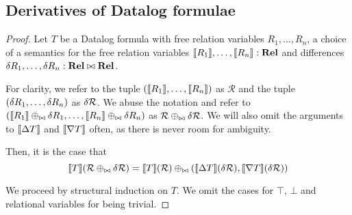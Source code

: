 \subsection {Derivatives of Datalog formulae}
\concreteDatalog*
\begin{proof}
  \newcommand{\sem}[1]{\denote{#1}}
  \label{prf:concreteDatalog}
  Let $T$ be a Datalog formula with free relation variables $R_1, \ldots, R_n$,
  a choice of a semantics for the free relation variables $\sem{R_1}, \ldots, \sem{R_n} : \Rel$
  and differences $\delta R_1, \ldots, \delta R_n : \mathbf{Rel} \bowtie \mathbf{Rel}$.

  
  \newcommand{\upsem}[1]{\sem{\updiff{#1}}}
  \newcommand{\downsem}[1]{\sem{\downdiff{#1}}}
  \newcommand{\bothsem}[1]{\sem{\bothdiff{#1}}}

  \newcommand{\semR}[0]{\mathcal{R}}
  \newcommand{\diffR}[0]{\change{\semR}}
  For clarity, we refer to the tuple $(\sem{R_1}, \ldots, \sem{R_n})$ as $\semR$ and
  the tuple $(\delta R_1, \ldots, \delta R_n)$ as $\diffR$. We abuse the notation
  and refer to $(\sem{R_1} \twist \change{R_1}, \ldots, \sem{R_n} \twist \change{R_n})$
  as $\semR \twist \diffR$. We will also omit the arguments to $\upsem{T}$ and
  $\downsem{T}$ often, as there is never room for ambiguity.

  Then, it is the case that 
  \begin{displaymath}
    \sem{T}(\semR \twist \diffR)
    =
    \sem{T}(\semR) \twist 
    (\sem{\updiff{T}}(\diffR), 
    \sem{\downdiff{T}}(\diffR))
  \end{displaymath}

  We proceed by structural induction on $T$. We omit the cases for $\top$, $\bot$
  and relational variables for being trivial.
  

\end{proof}
